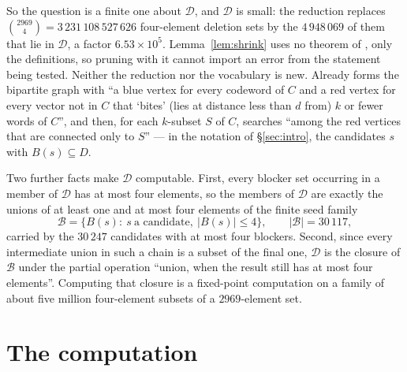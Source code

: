 \documentclass[11pt]{amsart}
\theoremstyle{remark}
\begin{document}
So the question is a finite one about $\mathcal D$, and $\mathcal D$ is small: the reduction
replaces $\binom{2969}{4}=3\,231\,108\,527\,626$ four-element deletion sets by the
$4\,948\,069$ of them that lie in $\mathcal D$, a factor $6.53\times 10^{5}$. Lemma~\ref{lem:shrink}
uses no theorem of \cite{Lys}, only the definitions, so pruning with it cannot import an error
from the statement being tested. Neither the reduction nor the vocabulary is new. Already
\cite[\S XII]{BSSS} forms the bipartite graph with ``a blue vertex for every codeword of $C$ and
a red vertex for every vector not in $C$ that `bites' (lies at distance less than $d$ from) $k$
or fewer words of $C$'', and then, for each $k$-subset $S$ of $C$, searches ``among the red
vertices that are connected only to $S$'' --- in the notation of \S\ref{sec:intro}, the
candidates $s$ with $B(s)\subseteq D$.

Two further facts make $\mathcal D$ computable. First, every blocker set occurring in a member
of $\mathcal D$ has at most four elements, so the members of $\mathcal D$ are exactly the
unions of at least one and at most four elements of the finite seed family
\[
 \mathcal B=\bigl\{B(s):\ s\ \text{a candidate},\ |B(s)|\le 4\bigr\},
 \qquad |\mathcal B|=30\,117 ,
\]
carried by the $30\,247$ candidates with at most four blockers. Second, since every
intermediate union in such a chain is a subset of the final one, $\mathcal D$ is the closure of
$\mathcal B$ under the partial operation ``union, when the result still has at most four
elements''. Computing that closure is a fixed-point computation on a family of about five
million four-element subsets of a $2969$-element set.

\section{The computation}\label{sec:computation}
\end{document}
